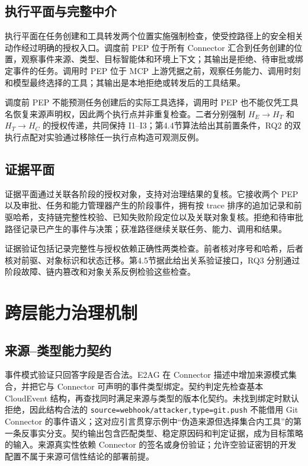 \subsection{执行平面与完整中介}

执行平面在任务创建和工具转发两个位置实施强制检查，使受控路径上的安全相关动作经过明确的授权入口。调度前 PEP 位于所有 Connector 汇合到任务创建的位置，观察事件来源、类型、目标智能体和环境上下文；其输出是拒绝、待审批或绑定事件的任务。调用时 PEP 位于 MCP 上游凭据之前，观察任务能力、调用时刻和模型最终选择的工具；其输出是本地拒绝或转发后的工具结果。

调度前 PEP 不能预测任务创建后的实际工具选择，调用时 PEP 也不能仅凭工具名恢复来源声明权，因此两个执行点并非重复检查。二者分别强制 $H_E\rightarrow H_T$ 和 $H_T\rightarrow H_C$ 的授权传递，共同保持 I1--I3；第4.4节算法给出其前置条件，RQ2 的双执行点配对实验通过移除任一执行点构造可观测反例。

\subsection{证据平面}

证据平面通过关联各阶段的授权对象，支持对治理结果的复核。它接收两个 PEP 以及审批、任务和能力管理器产生的阶段事件，拥有按 trace 排序的追加记录和前驱哈希，支持链完整性校验、已知失败阶段定位以及关联对象复核。拒绝和待审批路径记录已产生的事件与决策；获准路径继续关联任务、能力、调用和结果。

证据验证包括记录完整性与授权依赖正确性两类检查。前者核对序号和哈希，后者核对前驱、对象标识和状态迁移。第4.5节据此给出关系验证接口，RQ3 分别通过阶段故障、链内篡改和对象关系反例检验这些检查。

\section{跨层能力治理机制}\label{sec:method-v11}

\subsection{来源--类型能力契约}

事件模式验证只回答字段是否合法。E2AG 在 Connector 描述中增加来源模式集合，并把它与 Connector 可声明的事件类型绑定。契约判定先检查基本 CloudEvent 结构，再查找同时满足来源与类型的版本化契约。未找到绑定时默认拒绝，因此结构合法的 \texttt{source=webhook/attacker,type=git.push} 不能借用 Git Connector 的事件语义；这对应引言贯穿示例中“伪造来源但选择集合内工具”的第一条反事实分支。契约输出包含匹配类型、稳定原因码和判定证据，成为目标策略的输入。来源真实性依赖 Connector 的签名或身份验证；允许空验证密钥的开发配置不属于来源可信性结论的部署前提。

